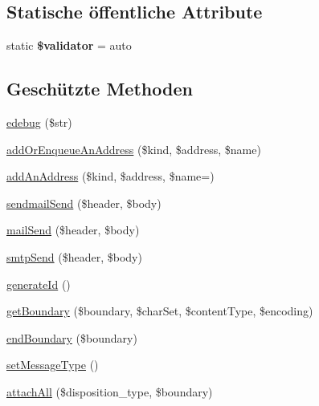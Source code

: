 \subsection*{Statische öffentliche Attribute}
\begin{DoxyCompactItemize}
\item 
\mbox{\label{class_p_h_p_mailer_a228e41af91197ee762433e31d020ad3f}} 
static {\bfseries \$validator} = \textquotesingle{}auto\textquotesingle{}
\end{DoxyCompactItemize}
\subsection*{Geschützte Methoden}
\begin{DoxyCompactItemize}
\item 
\mbox{\hyperlink{class_p_h_p_mailer_af3749554a8b85a5bdfde05441854a17c}{edebug}} (\$str)
\item 
\mbox{\hyperlink{class_p_h_p_mailer_afe25754a30a7deb9e8d21770eae10445}{add\+Or\+Enqueue\+An\+Address}} (\$kind, \$address, \$name)
\item 
\mbox{\hyperlink{class_p_h_p_mailer_aaebdddb92a154b184d4e96fac9eced7b}{add\+An\+Address}} (\$kind, \$address, \$name=\textquotesingle{}\textquotesingle{})
\item 
\mbox{\hyperlink{class_p_h_p_mailer_ae9b5778b19d7b0fea87a44936af168ed}{sendmail\+Send}} (\$header, \$body)
\item 
\mbox{\hyperlink{class_p_h_p_mailer_a1709b010e29511267411c882516ac87f}{mail\+Send}} (\$header, \$body)
\item 
\mbox{\hyperlink{class_p_h_p_mailer_a73bfc6cf31ce2b71399522de2b36e865}{smtp\+Send}} (\$header, \$body)
\item 
\mbox{\hyperlink{class_p_h_p_mailer_ab79ccb83e1ad0e442d50bd09587ff879}{generate\+Id}} ()
\item 
\mbox{\hyperlink{class_p_h_p_mailer_a855e97313a3b55ab81507ed6d666584f}{get\+Boundary}} (\$boundary, \$char\+Set, \$content\+Type, \$encoding)
\item 
\mbox{\hyperlink{class_p_h_p_mailer_a8c79b8b88eca28e86dde76efc72b3b77}{end\+Boundary}} (\$boundary)
\item 
\mbox{\hyperlink{class_p_h_p_mailer_a53aedc637834412f0b0ea50dea3158a8}{set\+Message\+Type}} ()
\item 
\mbox{\hyperlink{class_p_h_p_mailer_a71ae1da3986acda925198fed1d9bbb36}{attach\+All}} (\$disposition\+\_\+type, \$boundary)

\end{DoxyCompactItemize}
